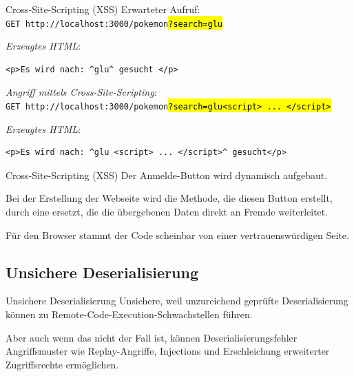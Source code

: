 \begin{example}{Cross-Site-Scripting (XSS)}
    Erwarteter Aufruf: \\
    \texttt{GET http://localhost:3000/pokemon\hl{?search=glu}}

    \emph{Erzeugtes HTML}:
    \begin{lstlisting}[language=HTML5]
        <p>Es wird nach: ^glu^ gesucht </p>
    \end{lstlisting}

    \emph{Angriff mittels Cross-Site-Scripting}: \\
    \texttt{GET http://localhost:3000/pokemon\hl{?search=glu<script> ... </script>}}

    \emph{Erzeugtes HTML}:
    \begin{lstlisting}[language=HTML5]
        <p>Es wird nach: ^glu <script> ... </script>^ gesucht</p>
    \end{lstlisting}
\end{example}

\begin{example}{Cross-Site-Scripting (XSS)}
    Der Anmelde-Button wird dynamisch aufgebaut.

    Bei der Erstellung der Webseite wird die Methode, die diesen Button erstellt, durch eine ersetzt, die die übergebenen Daten direkt an Fremde weiterleitet.

    Für den Browser stammt der Code scheinbar von einer vertrauenswürdigen Seite.
\end{example}

\subsection{Unsichere Deserialisierung}

\begin{defi}{Unsichere Deserialisierung}
    Unsichere, weil unzureichend geprüfte Deserialisierung können zu Remote-Code-Execution-Schwachstellen führen.

    Aber auch wenn das nicht der Fall ist, können Deserialisierungsfehler Angriffsmuster wie Replay-Angriffe, Injections und Erschleichung erweiterter Zugriffsrechte ermöglichen.
\end{defi}

